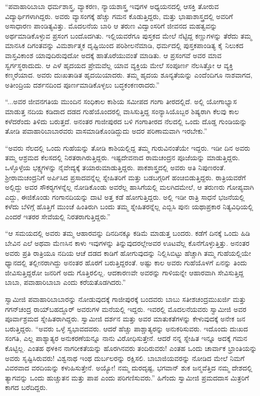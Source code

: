  “ಪವಾಹಾರಿಬಾಬಾ ಧರ್ಮಶಾಸ್ತ್ರ, ವ್ಯಾಕರಣ, ನ್ಯಾಯಶಾಸ್ತ್ರ ಇವುಗಳ ಅಧ್ಯಯನದಲ್ಲಿ ಆಸಕ್ತಿ ತೋರುವ ವಿದ್ಯಾರ್ಥಿಗಳಾಗಿದ್ದರು. ಅವರು ವ್ಯಾಸಂಗಕ್ಕೆ ಹೆಚ್ಚು ಗಮನ ಕೊಡುತ್ತಿದ್ದರು, ಮತ್ತು ಭಾಷಾಶಾಸ್ತ್ರದಲ್ಲಿ ಅವರಿಗೆ ಅಸಾಧಾರಣ ಪಾಂಡಿತ್ಯವಿತ್ತು. ಮೊದಲನೆಯ ಬಾರಿ ಆ ತರುಣ ವಿದ್ವಾಂಸರಿಗೆ ಜೀವನದ ಮಹತ್ವವನ್ನು ಅರ್ಥಮಾಡಿಕೊಳ್ಳುವ ಪ್ರಸಂಗ ಬಂದೊದಗಿತು. ಇಲ್ಲಿಯವರೆಗೂ ಪುಸ್ತಕದ ಮೇಲೆ ನೆಟ್ಟಿದ್ದ ಕಣ್ಣುಗಳನ್ನು ತೆರೆದು ತಮ್ಮ ಮಾನಸಿಕ ದಿಗಂತವನ್ನು ವಿಮರ್ಶಾತ್ಮಕ ದೃಷ್ಟಿಯಿಂದ ಪರಿಶೀಲನೆಮಾಡಿ, ಧರ್ಮದಲ್ಲಿ ಪುಸ್ತಕಪಾಂಡಿತ್ಯ ಕೈ ನಿಲುಕದ ವಾಸ್ತವಿಕಾಂಶ ಯಾವುದಿರುವುದೋ ಅದಕ್ಕೆ ಹಾತೊರೆಯುವಂತೆ ಮಾಡಿತು. ಆ ಪ್ರಸಂಗವೆ ಅವರ ಮಾವ ಸ್ವರ್ಗಸ್ಥರಾದುದು. ಆ ಎಳೆ ಹೃದಯದ ಪ್ರೇಮವೆಲ್ಲ ಯಾವ ವ್ಯಕ್ತಿಯ ಮೇಲೆ ಸಂಪೂರ್ಣ ನೆಲಸಿತ್ತೋ ಆ ವ್ಯಕ್ತಿ ಕಣ್ಮರೆಯಾದ. ಅವರು ದುಃಖತಾಡಿತ ಹೃದಯಿಯಾದರು. ತಮ್ಮ ಹೃದಯ ಶೂನ್ಯತೆಯನ್ನು ಎಂದೆಂದಿಗೂ ನಾಶವಾಗದ, ಅತೀಂದ್ರಿಯ ದರ್ಶನದಿಂದ ಪೂರ್ಣಮಾಡಿಕೊಳ್ಳಲು ಬದ್ಧಕಂಕಣರಾದರು.” 

 “...ಅವರ ಜೀವನಗತಿಯ ಮುಂದಿನ ಸಂಧಿಕಾಲ ಕಾಶಿಯ ಸಮೀಪದ ಗಂಗಾ ತೀರದಲ್ಲಿದೆ. ಅಲ್ಲಿ ಯೋಗಾಭ್ಯಾಸ ಮಾಡುತ್ತ ನದಿಯ ಕಡಿದಾದ ದಡದ ಗುಹೆಯೊಂದರಲ್ಲಿ ವಾಸಿಸುತ್ತಿದ್ದ ಸಂನ್ಯಾಸಿಯೊಬ್ಬರ ಶಿಷ್ಯರಾಗಿ ಕೆಲವು ಕಾಲ ಕಳೆದರೆಂದು ತಿಳಿದು ಬರುತ್ತದೆ. ಅನಂತರ ಗಾಜೀಪುರದ ಬಳಿ ಗಂಗಾತೀರದ ನೆಲದಲ್ಲಿ ಒಂದು ದೊಡ್ಡ ಗುಂಡಿಯನ್ನು ತೋಡಿ ಪವಾಹಾರಿಬಾಬಾರವರು ವಾಸಮಾಡಿಕೊಂಡಿದ್ದುದು ಅದರ ಪರಿಣಾಮವಾಗಿ ಇರಬೇಕು.” 

 “ಅವರು ನೆಲದಲ್ಲಿ ಒಂದು ಗುಹೆಯನ್ನು ತೋಡಿ ಕಾಶಿಯಲ್ಲಿದ್ದ ತಮ್ಮ ಗುರುವಿನಂತೆಯೇ ಇದ್ದರು. ಇಡೀ ದಿನ ಅವರು ತಮ್ಮ ಆಶ್ರಮದ ಕೆಲಸದಲ್ಲಿ ನಿರತರಾಗಿರುತ್ತಿದ್ದರು. ಇಷ್ಟದೇವನಾದ ರಾಮಚಂದ್ರನ ಪೂಜೆಯನ್ನು ಮಾಡುತ್ತಿದ್ದರು. ಒಳ್ಳೊಳ್ಳೆಯ ಭಕ್ಷ್ಯಗಳನ್ನು ನೈವೇದ್ಯಕ್ಕೆ ತಯಾರುಮಾಡುತ್ತಿದ್ದರು. ಪಾಕಶಾಸ್ತ್ರದಲ್ಲಿ ಅವರು ಅತಿ ನಿಪುಣರಂತೆ. ಶ‍್ರೀರಾಮಚಂದ್ರನಿಗೆ ಅರ್ಪಿಸಿದ ಪ್ರಸಾದವನ್ನೆಲ್ಲ ಸ್ನೇಹಿತರಿಗೆ ಮತ್ತು ಬಡಬಗ್ಗರಿಗೆ ಹಂಚಿಬಿಡುತ್ತಿದ್ದರು. ರಾತ್ರಿಯವರೆಗೆ ಅಲ್ಲಿದ್ದು ಅವರ ಸೌಕರ‍್ಯಗಳನ್ನೆಲ್ಲ ನೋಡಿಕೊಂಡು ಅವರೆಲ್ಲ ಹಾಸಿಗೆಯಲ್ಲಿ ಮಲಗಿದಮೇಲೆ, ಆ ತರುಣರು ಗೋಪ್ಯವಾಗಿ ಎದ್ದು, ಈಜಿಕೊಂಡು ಗಂಗಾನದಿಯನ್ನು ದಾಟಿ ಅತ್ತ ಕಡೆ ಹೋಗುತ್ತಿದ್ದರು. ಅಲ್ಲಿ ಇಡೀ ರಾತ್ರಿ ಸಾಧನೆ ಭಜನೆಯಲ್ಲಿ ಕಳೆದು ಬೆಳಿಗ್ಗೆ ಹೊತ್ತಿಗೆ ಮುಂಚೆ ಹಿಂತಿರುಗಿ ಬಂದು ತಮ್ಮ ಸ್ನೇಹಿತರನ್ನೆಲ್ಲ ಎಬ್ಬಿಸಿ ಪುನಃ ಯಥಾಪ್ರಕಾರ ನಿತ್ಯವಿಧಿಯಲ್ಲಿ ಎಂದರೆ ಇತರರ ಸೇವೆಯಲ್ಲಿ ನಿರತರಾಗುತ್ತಿದ್ದರು.” 

 “ಆ ಸಮಯದಲ್ಲಿ ಅವರು ತಮ್ಮ ಆಹಾರವನ್ನು ದಿನದಿನಕ್ಕೂ ಕಡಿಮೆ ಮಾಡುತ್ತ ಬಂದರು. ಕಡೆಗೆ ದಿನಕ್ಕೆ ಒಂದು ಹಿಡಿ ಬೇವಿನ ಎಲೆ ಅಥವಾ ಮೆಣಸಿನ ಕಾಳು ಇವುಗಳನ್ನು ತಿನ್ನುವುದರಲ್ಲೇಅವರ ಊಟವೆಲ್ಲ ಕೊನೆಗೊಳ್ಳುತ್ತಿತ್ತು. ಅನಂತರ ಅವರು ಪ್ರತಿ ರಾತ್ರಿಯೂ ನದಿಯ ಆಚೆ ದಡದ ಕಾಡಿಗೆ ಹೋಗುವುದನ್ನು ನಿಲ್ಲಿಸಿಬಿಟ್ಟು ಹೆಚ್ಚಾಗಿ ತಮ್ಮ ಗುಹೆಯಲ್ಲಿಯೇ ಧ್ಯಾನದಲ್ಲಿ ತಲ್ಲೀನರಾಗಿದ್ದು ಅನಂತರ ಹೊರಗೆ ಬರುತ್ತಿದ್ದರಂತೆ. ಅಷ್ಟು ಕಾಲ ಅವರು ಗುಹೆಯೊಳಗೆ ಏನನ್ನು ತಿಂದು ಜೀವಿಸುತ್ತಿದ್ದರೋ ಜನರಿಗೆ ಅದು ಗೊತ್ತಿರಲಿಲ್ಲ. ಆದಕಾರಣವೇ ಅವರನ್ನು ಗಾಳಿಯನ್ನೇ ಆಹಾರವಾಗಿ ಸೇವಿಸುತ್ತಿದ್ದ ಬಾಬಾ, ಪವಾಹಾರಿಬಾಬಾ ಎಂದು ಕರೆಯತೊಡಗಿದರು.” 

 ಸ್ವಾಮೀಜಿ ಪವಾಹಾರಿಬಾಬಾರನ್ನು ನೋಡುವುದಕ್ಕೆ ಗಾಜೀಪುರಕ್ಕೆ ಬಂದವರು ಬಾಬು ಸತೀಶಚಂದ್ರಮುಖರ್ಜಿ ಮತ್ತು ಗಗನ್‍ಚಂದ್ರ ರಾಯ್‍ಬಹದ್ದೂರ್ ಅವರುಗಳ ಮನೆಯಲ್ಲಿ ಇದ್ದರು. ಇವರಲ್ಲಿ ಮೊದಲನೆಯವರು ಸ್ವಾಮೀಜಿ ಅವರ ಪೂರ್ವಾಶ್ರಮದ ಸ್ನೇಹಿತರಾಗಿದ್ದರು. ಸ್ವಾಮೀಜಿ ದರ್ಶನ ಮತ್ತು ಅವರ ಮಾತುಕತೆಗಳನ್ನು ಕೇಳುವುದಕ್ಕೆ ಅನೇಕ ಜನ ಬರುತ್ತಿದ್ದರು. “ಅವರು ಒಳ್ಳೆ ಸ್ವಭಾವದವರು. ಆದರೆ ಹೆಚ್ಚು ಪಾಶ್ಚಾತ್ಯರನ್ನು ಅನುಕರಿಸುವರು. ಇದೊಂದು ದುಃಖದ ಸಂಗತಿ, ಎಲ್ಲ ಪಾಶ್ಯಾತ್ಯರ ಅನುಕರಣೆಯನ್ನೂ ನಾನು ವಿರೋಧಿಸುತ್ತೇನೆ. ಆದರೆ ನನ್ನ ಸ್ನೇಹಿತ ಇನ್ನೂ ಅದಕ್ಕೆ ಗಮನ ಕೊಟ್ಟಿಲ್ಲ. ಎಂತಹ ಥಳಕಿನ ನಾಗರೀಕತೆಯನ್ನು ಹೊರಗಿನವರು ತಂದಿರುವರು! ಎಂತಹ ಒಂದು ಚಾರ್ವಾಕ ಭ್ರಾಂತಿಯನ್ನು ಅವರು ಸೃಷ್ಟಿಸಿರುವರು! ವಿಶ್ವನಾಥ ಇಂಥ ದುರ್ಬಲರನ್ನು ರಕ್ಷಿಸಲಿ. ಬಾಬಾಜಿಯವರನ್ನು ನೋಡಿದ ಮೇಲೆ ನಿಮಗೆ ವಿವರವಾದ ವರದಿಯನ್ನು ಕಳುಹಿಸುತ್ತೇನೆ. ಅಯ್ಯೋ! ನಮ್ಮ ದುರದೃಷ್ಟ, ಭಗವಾನ್ ಶುಕ ಜನ್ಮವೆತ್ತಿದ ನಮ್ಮ ದೇಶದಲ್ಲಿ ತ್ಯಾಗವನ್ನು ಒಂದು ಹುಚ್ಚುತನ ಮತ್ತು ಪಾಪ ಎಂದು ಪರಿಗಣಿಸುವರು.” ಹಿಗೆಂದು ಸ್ವಾಮೀಜಿ ಪ್ರಮದದಾಸ ಮಿತ್ರರಿಗೆ ಕಾಗದ ಬರೆದಿದ್ದರು. 

